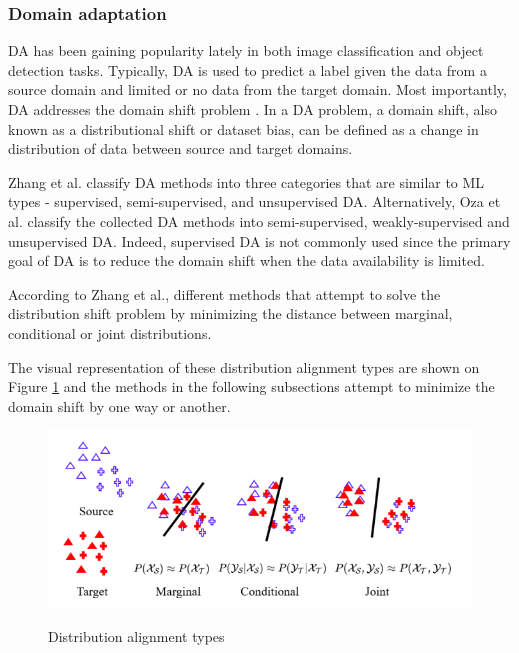 \documentclass[english, 12pt, a4paper, elec, utf8, a-1b, online]{aaltothesis}
\begin{document}


\subsubsection{Domain adaptation}
\label{DA_section} 
DA has been gaining popularity lately\cite{Zhang2021} in both image classification and object detection tasks. Typically, DA is used to predict a label given the data from a source domain and limited or no data from the target domain. Most importantly, DA addresses the domain shift problem \cite{Zhang2021}. In a DA problem, a domain shift, also known as a distributional shift or dataset bias, can be defined as a change in distribution of data between source and target domains. 


Zhang et al. \cite{Zhang2021} classify DA methods into three categories that are similar to ML types - supervised, semi-supervised, and unsupervised DA. Alternatively, Oza et al. \cite{Oza2021} classify the collected DA methods into semi-supervised, weakly-supervised and unsupervised DA. Indeed, supervised DA is not commonly used since the primary goal of DA is to reduce the domain shift when the data availability is limited. 

According to Zhang et al.\cite{Zhang2021}, different methods that attempt to solve the distribution shift problem by minimizing the distance between marginal, conditional or joint distributions. 

The visual representation of these distribution alignment types are shown on Figure \ref{distribution} and the methods in the following subsections attempt to minimize the domain shift by one way or another. 

\begin{figure}[htb]
	\begin{center}
		\includegraphics[width=12cm]{./distribution.png}
	\end{center}
	\caption{Distribution alignment types\cite{Zhang2021}}
	\begin{center}
		\label{distribution}
	\end{center}
\end{figure}
\FloatBarrier 
\end{document}
